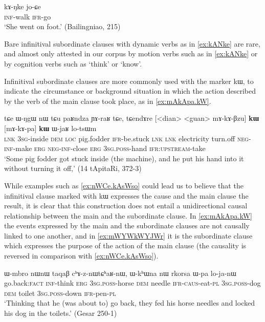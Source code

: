 \documentclass[oldfontcommands,oneside,a4paper,11pt]{article}
\newcommand{\ipa}[1]{{\phon #1}} %
\begin{document}
\begin{exe}
\ex \label{ex:kANke}
\gll
\ipa{kɤ-ŋke} \ipa{jo-ɕe} \\
\textsc{inf}-walk \textsc{ifr}-go \\
\glt `She went on foot.' (Bailingniao, 215)
\end{exe} 

Bare infinitival subordinate clauses with dynamic verbs as in \ref{ex:kANke} are rare, and almost only attested in our corpus by motion verbs such as in \ref{ex:kANke} or by cognition verbs such as `think' or `know'.

 Infinitival subordinate clauses are more commonly used with the marker \ipa{kɯ}, to indicate the circumstance or background situation in which the action described by the verb of the main clause took place, as in \ref{ex:mAkApa.kW}. 

\begin{exe}
\ex \label{ex:mAkApa.kW}
\gll
\ipa{tɕe}   	\ipa{ɯ-ŋgɯ}   	\ipa{nɯ} \ipa{tɕu}   	\ipa{paʁndza}   	\ipa{ɲɤ-raʁ}   	\ipa{tɕe,}   	\ipa{tɕendɤre}   	[<dian>   	<guan>   	\ipa{mɤ-kɤ-βzu}] 	\ipa{\textbf{kɯ}}   	[\ipa{mɤ-kɤ-pa}]   	\ipa{\textbf{kɯ}}   	\ipa{ɯ-jaʁ}   	\ipa{lo-tsɯm}   \\
\textsc{lnk} \textsc{3sg}-inside \textsc{dem} \textsc{loc} pig.fodder \textsc{ifr}-be.stuck \textsc{lnk}
\textsc{lnk} electricity turn.off \textsc{neg-inf}-make \textsc{erg}  \textsc{neg-inf}-close \textsc{erg}  \textsc{3sg.poss}-hand \textsc{ifr:upstream}-take \\
\glt `Some pig fodder got stuck inside (the machine), and he put his hand into it without turning it off,' (14 tApitaRi, 372-3)
\end{exe} 

 While  examples such as \ref{ex:nWCe.kAsWso} could lead us to believe that the infinitival clause marked with \ipa{kɯ}  expresses the cause and the main clause the result, it is clear that this construction does not entail a unidirectional causal relationship between the main and the subordinate clause. In \ref{ex:mAkApa.kW} the events expressed by the main and the subordinate clauses are not causally linked to one another, and in  \ref{ex:mWYWkWYJWr} it is the subordinate clause which expresses the purpose of the action of the main clause (the causality is reversed in comparison with \ref{ex:nWCe.kAsWso}).

  \begin{exe}
\ex \label{ex:nWCe.kAsWso}
\gll 
[\ipa{nɯɕe}  	\ipa{kɤ-sɯso}]  	\ipa{kɯ,}  	\ipa{ɯ-mbro}  	\ipa{nɯnɯ}  	\ipa{taqaβ}  	\ipa{cʰɤ-z-nɯtɕʰaʁ-nɯ,}  	\ipa{ɯ-kʰɯna}  	\ipa{nɯ}  	\ipa{rkorsa}  	\ipa{ɯ-pa}  	\ipa{lo-ja-nɯ}  \\
go.back:\textsc{fact} \textsc{inf}-think \textsc{erg} \textsc{3sg.poss}-horse \textsc{dem} needle \textsc{ifr-caus}-eat-\textsc{pl}   \textsc{3sg.poss}-dog \textsc{dem} toilet \textsc{3sg.poss}-down \textsc{ifr}-pen-\textsc{pl} \\
\glt `Thinking that he (was about to) go back, they fed his horse needles and locked his dog in the toilets.' (Gesar 250-1)
 \end{exe} 
 
\end{document}
